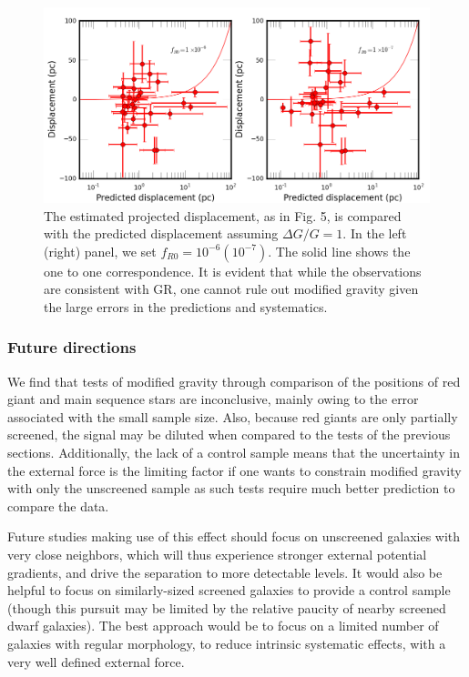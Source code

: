 \documentclass[useAMS,usenatbib,twocolumn]{mn2e}
\begin{document}
\begin{figure}
\includegraphics[scale=0.5]{figures/disppred.png}
  \caption{The estimated projected displacement, as in Fig. 5, is compared with the predicted displacement assuming $\Delta
G/G=1$. In the left (right) panel, we set $f_{R0}=10^{-6} (10^{-7})$. 
 The solid
line shows the one to one correspondence. It is evident that while 
the observations are consistent with
GR, one cannot rule out modified gravity 
given the large errors in the predictions and systematics.}
\label{fig:rgdisppred}
\end{figure}

\subsubsection{Future directions}
We find that tests of modified gravity through
comparison of the positions of red giant and main sequence stars
are inconclusive, mainly owing to the error associated with the
small sample size.  Also, because red giants are only
partially screened, the signal may be diluted when compared to
the tests of the previous sections.
Additionally, the lack of a control sample means that
the uncertainty in the external force is the limiting factor
if one wants to constrain modified gravity with only the unscreened sample as
such tests require much better prediction to compare the data. 

Future studies making use of this effect should focus on unscreened galaxies
with very close neighbors, which will thus experience stronger external
potential gradients, and drive the separation to more detectable levels.
It would also be helpful to focus on similarly-sized screened galaxies to
provide a control sample (though this pursuit may be limited by the relative
paucity of nearby screened dwarf galaxies).  
The best approach would be to focus on a limited number of galaxies with
regular morphology, to reduce intrinsic systematic effects, with a very well defined
external force.
\end{document}
